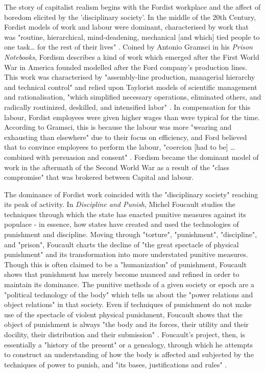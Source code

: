 The story of capitalist realism begins with the Fordist workplace and the affect of boredom elicited by the 'disciplinary society'. In the middle of the 20th Century, Fordist models of work and labour were dominant, characterised by work that was "routine, hierarchical, mind-deadening, mechanical [and which] tied people to one task\ldots{} for the rest of their lives" \citep[51]{horgan_lost_2021}. Coined by Antonio Gramsci in his \emph{Prison Notebooks}, Fordism describes a kind of work which emerged after the First World War in America founded modelled after the Ford company's production lines. This work was characterised by "assembly-line production, managerial hierarchy and technical control" and relied upon Taylorist models of scientific management and rationalisation, "which simplified necessary operations, eliminated others, and radically routinized, deskilled, and intensified labor" \citep[34]{antonio_new_2000}. In compensation for this labour, Fordist employees were given higher wages than were typical for the time. According to Gramsci, this is because the labour was more "wearing and exhausting than elsewhere" \citep[311-312]{gramsci_selections_2007} due to their focus on efficiency, and Ford believed that to convince employees to perform the labour, "coercion [had to be] \ldots{} combined with persuasion and consent" \citep[310]{gramsci_selections_2007}. Fordism became the dominant model of work in the aftermath of the Second World War as a result of the "class compromise" \citep[X]{harvey_brief_2007} that was brokered between Capital and labour. 

The dominance of Fordist work coincided with the "disciplinary society" reaching its peak of activity. In \emph{Discipline and Punish}, Michel Foucault studies the techniques through which the state has enacted
punitive measures against its populace - in essence, how states have created and used the technologies of punishment and discipline. Moving through "torture", "punishment", "discipline", and "prison", Foucault charts the decline of "the great spectacle of physical punishment" \citep[14]{foucault_discipline_1977} and its transformation into more understated punitive measures. Though this is often claimed to be a "humanization" \citep[7]{foucault_discipline_1977} of punishment, Foucault shows that punishment has merely become nuanced and refined in order to maintain its dominance. The punitive methods of a given society or epoch are a "political technology of the body" which tells us about the "power relations and object relations" \citep[24]{foucault_discipline_1977} in that society. Even if techniques of punishment do not make use of the spectacle of violent physical punishment, Foucault shows that the object of punishment is always "the body and its forces, their utility and their docility, their distribution and their submission" \citep[25]{foucault_discipline_1977}. Foucault's project, then, is essentially a "history of the present" \citep[31]{foucault_discipline_1977} or a genealogy, through which he attempts to construct an understanding of how the body is affected and subjected by the techniques of power to punish, and "its bases, justifications and rules" \citep[23]{foucault_discipline_1977}.

